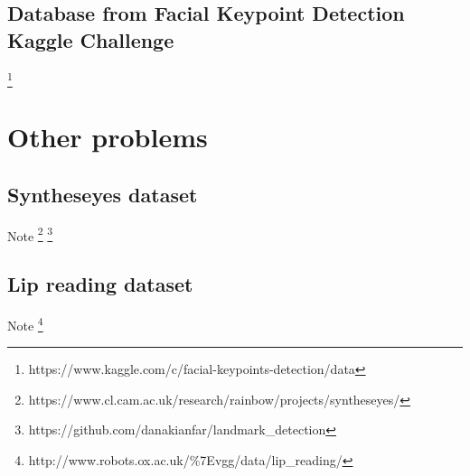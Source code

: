 \subsection{Database from Facial Keypoint Detection Kaggle Challenge}\footnote{https://www.kaggle.com/c/facial-keypoints-detection/data}
\section{Other problems}
\subsection{Syntheseyes dataset}
Note \footnote{https://www.cl.cam.ac.uk/research/rainbow/projects/syntheseyes/}
\footnote{https://github.com/danakianfar/landmark\_detection}
\subsection{Lip reading dataset}
Note \footnote{http://www.robots.ox.ac.uk/$\%$7Evgg/data/lip\_reading/}
